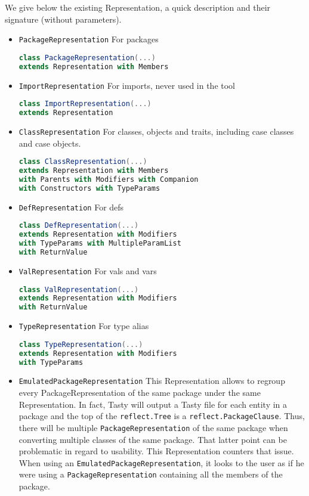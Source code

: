 \documentclass{report}
\begin{document}
We give below the existing Representation, a quick description and their signature (without parameters).
\begin{itemize}
    \item \texttt{PackageRepresentation} For packages
\begin{lstlisting}[language=scala]
class PackageRepresentation(...)
extends Representation with Members
\end{lstlisting}
    \item \texttt{ImportRepresentation} For imports, never used in the tool
\begin{lstlisting}[language=scala]
class ImportRepresentation(...)
extends Representation
\end{lstlisting}
    \item \texttt{ClassRepresentation} For classes, objects and traits, including case classes and case objects.
\begin{lstlisting}[language=scala]
class ClassRepresentation(...)
extends Representation with Members
with Parents with Modifiers with Companion
with Constructors with TypeParams
\end{lstlisting}
    \item \texttt{DefRepresentation} For defs
\begin{lstlisting}[language=scala]
class DefRepresentation(...)
extends Representation with Modifiers
with TypeParams with MultipleParamList
with ReturnValue
\end{lstlisting}
    \item \texttt{ValRepresentation} For vals and vars
\begin{lstlisting}[language=scala]
class ValRepresentation(...)
extends Representation with Modifiers
with ReturnValue
\end{lstlisting}
    \item \texttt{TypeRepresentation} For type alias
\begin{lstlisting}[language=scala]
class TypeRepresentation(...)
extends Representation with Modifiers
with TypeParams 
\end{lstlisting}
    \item \texttt{EmulatedPackageRepresentation} This Representation allows to regroup every PackageRepresentation of the same package under the same Representation. In fact, Tasty will output a Tasty file for each entity in a package and the top of the \texttt{reflect.Tree} is a \texttt{reflect.PackageClause}. Thus, there will be multiple \texttt{PackageRepresentation} of the same package when converting multiple classes of the same package. That latter point can be problematic in regard to usability. This Representation counters that issue. When using an \texttt{EmulatedPackageRepresentation}, it looks to the user as if he were using a \texttt{PackageRepresentation} containing all the members of the package.
\end{itemize}
\end{document}
